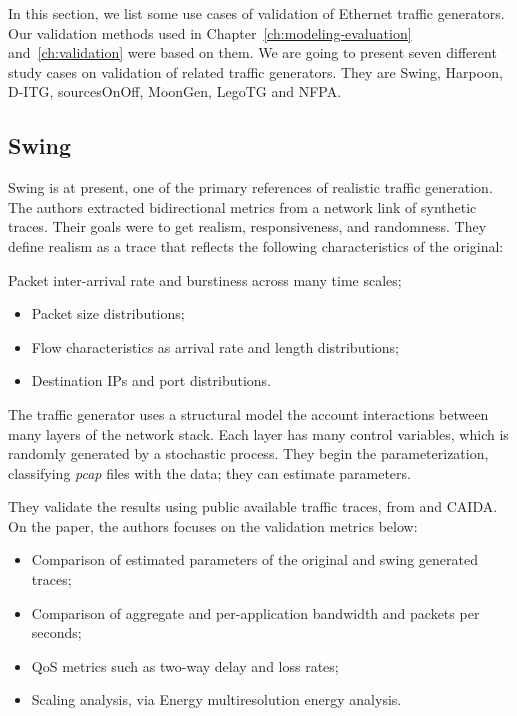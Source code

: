 In this section, we list some use cases of validation of Ethernet traffic generators. Our validation methods used in Chapter~\ref{ch:modeling-evaluation} and~\ref{ch:validation} were based on them. We are going to present seven different study cases on validation of related traffic generators. They are Swing,   Harpoon\cite{harpoon-validation}, D-ITG\cite{ditg-paper}, sourcesOnOff\cite{sourcesonoff-paper}, MoonGen\cite{moongen-paper}, LegoTG\cite{legotg-paper} and NFPA\cite{nfpa-paper}.

\subsection{Swing}

Swing\cite{swing-paper} is at present, one of the primary references of realistic traffic generation. The authors extracted bidirectional metrics from a network link of synthetic traces. Their goals were to get realism, responsiveness, and randomness. They define realism as a trace that reflects the following characteristics of the original:

Packet inter-arrival rate and burstiness across many time scales;
\begin{itemize}
\item Packet size distributions;
\item Flow characteristics as arrival rate and length distributions;
\item Destination IPs and port distributions.
\end{itemize}

The traffic generator uses a structural model the account interactions between many layers of the network stack. Each layer has many control variables, which is randomly generated by a stochastic process. They begin the parameterization, classifying \cite{web-libpcap} \textit{pcap} files with the data; they can estimate parameters.

They validate the results using public available traffic traces, from \cite{web-mawi} and CAIDA\cite{web-caida}. On the paper, the authors focuses on  the validation metrics below:

\begin{itemize}
\item Comparison of estimated parameters of the original and swing generated traces;
\item Comparison of aggregate and per-application bandwidth and packets per seconds;
\item QoS metrics such as two-way delay and loss rates;
\item Scaling analysis, via Energy multiresolution energy analysis.
\end{itemize}

